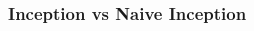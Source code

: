\documentclass{beamer}
\begin{document}
\begin{frame}
	\frametitle{Inception vs Naive Inception}
\begin{columns}
	\begin{column}{0.5\textwidth}
		\begin{figure}
		\end{figure}
	\end{column}
	\begin{column}{0.5\textwidth}
		\begin{figure}
		\end{figure}
	\end{column}
\end{columns}
\end{frame}

	
\end{document}
